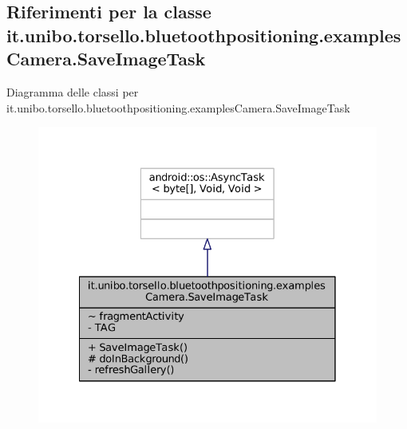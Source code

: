 \hypertarget{classit_1_1unibo_1_1torsello_1_1bluetoothpositioning_1_1examplesCamera_1_1SaveImageTask}{}\subsection{Riferimenti per la classe it.\+unibo.\+torsello.\+bluetoothpositioning.\+examples\+Camera.\+Save\+Image\+Task}
\label{classit_1_1unibo_1_1torsello_1_1bluetoothpositioning_1_1examplesCamera_1_1SaveImageTask}


Diagramma delle classi per it.\+unibo.\+torsello.\+bluetoothpositioning.\+examples\+Camera.\+Save\+Image\+Task
\nopagebreak
\begin{figure}[H]
\begin{center}
\leavevmode
\includegraphics[width=328pt]{classit_1_1unibo_1_1torsello_1_1bluetoothpositioning_1_1examplesCamera_1_1SaveImageTask__inherit__graph}
\end{center}
\end{figure}


